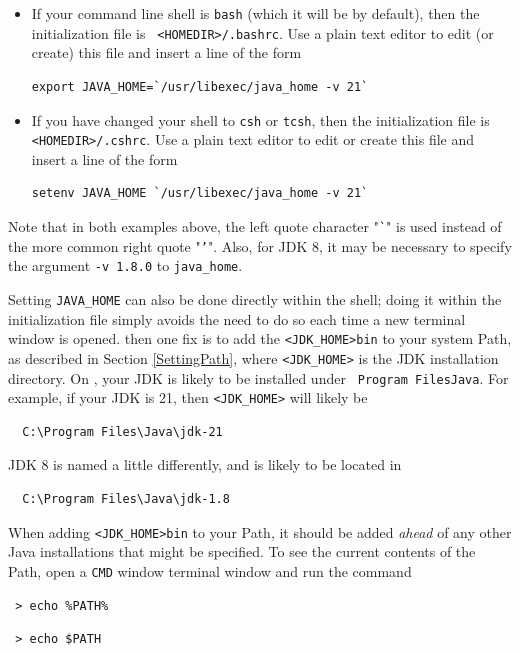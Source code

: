 \begin{itemize}

\item If your command line shell is {\tt bash} (which
it will be by default), then the initialization file is {\tt
<HOMEDIR>/.bashrc}. Use a plain text editor to edit (or create) this file and
insert a line of the form
%
\begin{lstlisting}[]
  export JAVA_HOME=`/usr/libexec/java_home -v 21`
\end{lstlisting}
%

\item If you have changed your shell to {\tt csh} or {\tt tcsh},
then the initialization file is {\tt <HOMEDIR>/.cshrc}. Use a plain text editor
to edit or create this file and insert a line of the form
%
\begin{lstlisting}[]
  setenv JAVA_HOME `/usr/libexec/java_home -v 21`
\end{lstlisting}
%

\end{itemize}

Note that in both examples above, the left quote character "{\tt \`{}}" is used
instead of the more common right quote "{\tt '}".  Also, for JDK 8, it may be
necessary to specify the argument {\tt -v 1.8.0} to {\tt java\_home}.

Setting {\tt JAVA\_HOME} can also be done directly within the shell;
doing it within the initialization file simply avoids the need to do
so each time a new terminal window is opened.
\else %
then one fix is to add the \directory{} {\tt <JDK\_HOME>\SEP bin} to
your system Path, as described in Section \ref{SettingPath},
where {\tt <JDK\_HOME>} is the JDK installation directory.
\ifWindows
On \SYSTEM{}, your JDK is likely to be installed under {\tt
Program Files\SEP Java}. For example, if your JDK is 21, 
then {\tt <JDK\_HOME>} will likely be
\begin{verbatim}
  C:\Program Files\Java\jdk-21
\end{verbatim}
JDK 8 is named a little differently, and is likely to be located in
\begin{verbatim}
  C:\Program Files\Java\jdk-1.8
\end{verbatim}
\fi
When adding {\tt <JDK\_HOME>\SEP bin} to your Path, it should be added {\it
ahead} of any other Java installations that might be specified. To
see the current contents of the Path, open a
\ifWindows
{\tt CMD} window
\else
terminal window
\fi
and run the command
\ifWindows
\begin{verbatim}
 > echo %PATH%
\end{verbatim}
\else
\begin{verbatim}
 > echo $PATH
\end{verbatim}
\fi
\fi %

